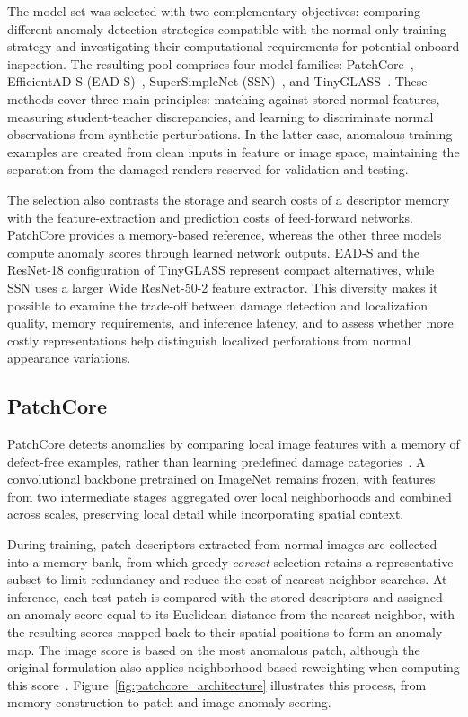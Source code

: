 The model set was selected with two complementary objectives: comparing different anomaly detection strategies compatible with the normal-only training strategy and investigating their computational requirements for potential onboard inspection. The resulting pool comprises four model families: PatchCore~\cite{roth2022patchcore}, EfficientAD-S (EAD-S)~\cite{batzner2024efficientad}, SuperSimpleNet (SSN)~\cite{rolih2026nolabel}, and TinyGLASS~\cite{bonazzi2026tinyglass}. These methods cover three main principles: matching against stored normal features, measuring student-teacher discrepancies, and learning to discriminate normal observations from synthetic perturbations. In the latter case, anomalous training examples are created from clean inputs in feature or image space, maintaining the separation from the damaged renders reserved for validation and testing.

The selection also contrasts the storage and search costs of a descriptor memory with the feature-extraction and prediction costs of feed-forward networks. PatchCore provides a memory-based reference, whereas the other three models compute anomaly scores through learned network outputs. EAD-S and the ResNet-18 configuration of TinyGLASS represent compact alternatives, while SSN uses a larger Wide ResNet-50-2 feature extractor. This diversity makes it possible to examine the trade-off between damage detection and localization quality, memory requirements, and inference latency, and to assess whether more costly representations help distinguish localized perforations from normal appearance variations.

\subsection{PatchCore}
\label{subsec:patchcore}

PatchCore detects anomalies by comparing local image features with a memory of defect-free examples, rather than learning predefined damage categories~\cite{roth2022patchcore}. A convolutional backbone pretrained on ImageNet remains frozen, with features from two intermediate stages aggregated over local neighborhoods and combined across scales, preserving local detail while incorporating spatial context.

During training, patch descriptors extracted from normal images are collected into a memory bank, from which greedy \emph{coreset} selection retains a representative subset to limit redundancy and reduce the cost of nearest-neighbor searches. At inference, each test patch is compared with the stored descriptors and assigned an anomaly score equal to its Euclidean distance from the nearest neighbor, with the resulting scores mapped back to their spatial positions to form an anomaly map. The image score is based on the most anomalous patch, although the original formulation also applies neighborhood-based reweighting when computing this score~\cite{roth2022patchcore}. Figure~\ref{fig:patchcore_architecture} illustrates this process, from memory construction to patch and image anomaly scoring.

